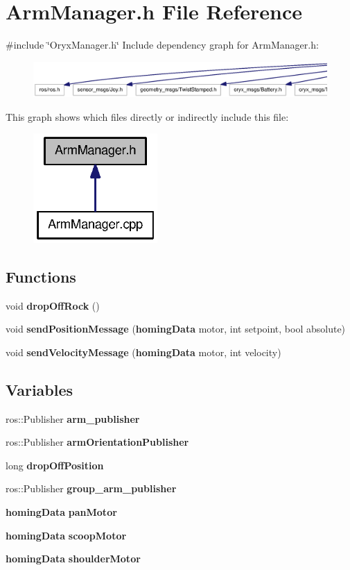 \section{\-Arm\-Manager.\-h \-File \-Reference}
\label{ArmManager_8h}
{\ttfamily \#include \char`\"{}\-Oryx\-Manager.\-h\char`\"{}}\*
\-Include dependency graph for \-Arm\-Manager.\-h\-:
\nopagebreak
\begin{figure}[H]
\begin{center}
\leavevmode
\includegraphics[width=350pt]{ArmManager_8h__incl}
\end{center}
\end{figure}
\-This graph shows which files directly or indirectly include this file\-:
\nopagebreak
\begin{figure}[H]
\begin{center}
\leavevmode
\includegraphics[width=134pt]{ArmManager_8h__dep__incl}
\end{center}
\end{figure}
\subsection*{\-Functions}
\begin{DoxyCompactItemize}
\item 
void {\bf drop\-Off\-Rock} ()
\item 
void {\bf send\-Position\-Message} ({\bf homing\-Data} motor, int setpoint, bool absolute)
\item 
void {\bf send\-Velocity\-Message} ({\bf homing\-Data} motor, int velocity)
\end{DoxyCompactItemize}
\subsection*{\-Variables}
\begin{DoxyCompactItemize}
\item 
ros\-::\-Publisher {\bf arm\-\_\-publisher}
\item 
ros\-::\-Publisher {\bf arm\-Orientation\-Publisher}
\item 
long {\bf drop\-Off\-Position}
\item 
ros\-::\-Publisher {\bf group\-\_\-arm\-\_\-publisher}
\item 
{\bf homing\-Data} {\bf pan\-Motor}
\item 
{\bf homing\-Data} {\bf scoop\-Motor}
\item 
{\bf homing\-Data} {\bf shoulder\-Motor}
\end{DoxyCompactItemize}


